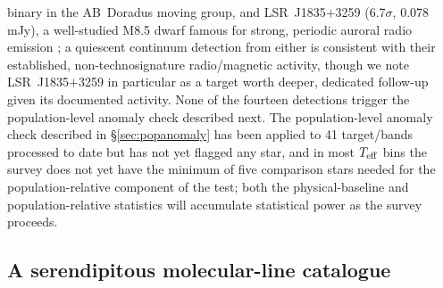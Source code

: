 \documentclass{openjournal}
\begin{document}
binary in the AB~Doradus moving group, and LSR~J1835$+$3259
(6.7$\sigma$, 0.078\,mJy), a well-studied M8.5 dwarf famous for strong,
periodic auroral radio emission \citep{Hallinan2007}; a quiescent
continuum detection from either is consistent with their established,
non-technosignature radio/magnetic activity, though we note LSR~J1835$+$3259
in particular as a target worth deeper, dedicated follow-up given its
documented activity. None of the fourteen
detections trigger the population-level anomaly check described next.
The population-level anomaly check described in
\S\ref{sec:popanomaly} has been applied to 41 target/bands processed to
date but has not yet flagged any star, and in most $T_{\rm eff}$ bins the
survey does not yet have the minimum of five comparison stars needed for
the population-relative component of the test; both the physical-baseline
and population-relative statistics will accumulate statistical power as
the survey proceeds.

\subsection{A serendipitous molecular-line catalogue}
\label{sec:linecatalogue}
\end{document}
